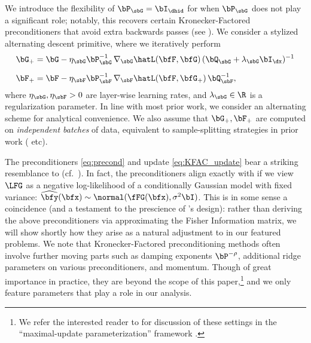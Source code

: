 We introduce the flexibility of $\bP_{\sbG} = \bI_{\dhid}$ for when $\bP_{\sbG}$ does not play a significant role; notably, this recovers certain Kronecker-Factored preconditioners that avoid extra backwards passes (see ).
We consider a stylized alternating descent primitive, where we iteratively perform
\begin{align}\label{eq:KFAC_update}
    \begin{split}
        \bG_+ &= \bG - \eta_{\sbG} \bP_\sbG^{-1}\, \nabla_{\sbG} \hatL(\bfF, \bfG)\, (\bQ_\sbG + \lambda_\sbG \bI_{\dx})^{-1} \\[0.2cm]
        \bF_+ &= \bF - \eta_\sbF \bP_\sbF^{-1}\, \nabla_\sbF \hatL(\bfF, \bfG_+)\, \bQ_{\sbF}^{-1},
    \end{split}
\end{align}
where $\eta_\sbG, \eta_\sbF > 0$ are layer-wise learning rates, and $\lambda_\sbG \in \R$ is a regularization parameter.
In line with most prior work, we consider an alternating scheme for analytical convenience.
We also assume that $\bG_+, \bF_+$ are computed on \emph{independent batches} of data, equivalent to sample-splitting strategies in prior work (\citet{collins2021exploiting,zhang2023meta,ba2022high,moniri_atheory2023} etc).


The preconditioners \eqref{eq:precond} and update \eqref{eq:KFAC_update} bear a striking resemblance to \KFAC (cf.\ ). In fact, the preconditioners align exactly with \KFAC if we view $\LFG$ as a negative log-likelihood of a conditionally Gaussian model with fixed variance: $\widehat \bfy(\bfx) \sim \normal(\fFG(\bfx), \sigma^2 \bI)$. This is in some sense a coincidence (and a testament to the prescience of \KFAC's design): rather than deriving the above preconditioners via approximating the Fisher Information matrix, we will show shortly how they arise as a natural adjustment to \SGD in our featured problems. We note that Kronecker-Factored preconditioning methods often involve further moving parts such as damping exponents $\bP^{-\rho}$, additional ridge parameters on various preconditioners, and momentum. Though of great importance in practice, they are beyond the scope of this paper,\footnote{We refer the interested reader to \citet{ishikawa2023parameterization} for discussion of these settings in the ``maximal-update parameterization'' framework \cite{yang2021tensor}.} and we only feature parameters that play a role in our analysis.

